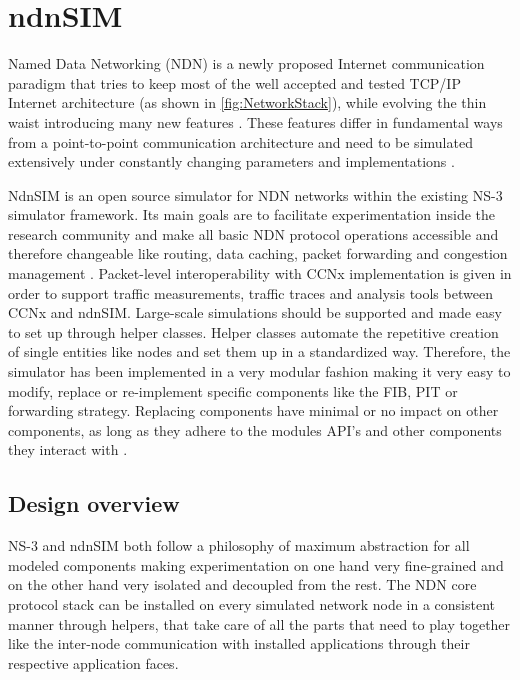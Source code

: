 \chapter{ndnSIM}

Named Data Networking (NDN) is a newly proposed Internet communication paradigm that tries to keep most of the well accepted and tested TCP/IP Internet architecture (as shown in \ref{fig:NetworkStack}), while evolving the thin waist introducing many new features \cite{ndn17}. These features differ in fundamental ways from a point-to-point communication architecture and need to be simulated extensively under constantly changing parameters and implementations \cite{Ajunwadkar14}.

NdnSIM is an open source simulator for NDN networks within the existing NS-3 simulator framework. Its main goals are to facilitate experimentation inside the research community and make all basic NDN protocol operations accessible and therefore changeable like routing, data caching, packet forwarding and congestion management \cite{mastorakis16}. Packet-level interoperability with CCNx implementation is given in order to support traffic measurements, traffic traces and analysis tools between CCNx and ndnSIM. Large-scale simulations should be supported and made easy to set up through helper classes. Helper classes automate the repetitive creation of single entities like nodes and set them up in a standardized way. Therefore, the simulator has been implemented in a very modular fashion making it very easy to modify, replace or re-implement specific components like the FIB, PIT or forwarding strategy. Replacing components have minimal or no impact on other components, as long as they adhere to the modules API's and other components they interact with \cite{Afanasyev16}.

\newpage

\section{Design overview}

NS-3 and ndnSIM both follow a philosophy of maximum abstraction for all modeled components making experimentation on one hand very fine-grained and on the other hand very isolated and decoupled from the rest. The NDN core protocol stack can be installed on every simulated network node in a consistent manner through helpers, that take care of all the parts that need to play together like the inter-node communication with installed applications through their respective application faces.

